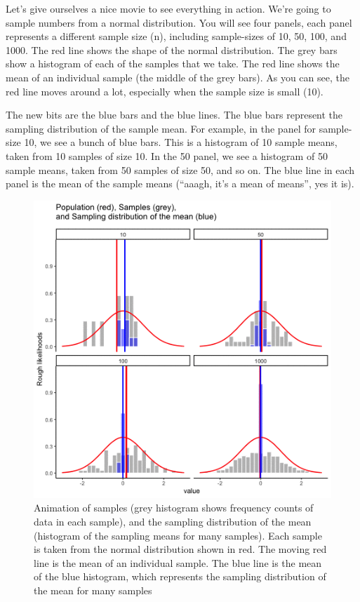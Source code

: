 \documentclass[
]{book}
\begin{document}
Let's give ourselves a nice movie to see everything in action. We're going to sample numbers from a normal distribution. You will see four panels, each panel represents a different sample size (n), including sample-sizes of 10, 50, 100, and 1000. The red line shows the shape of the normal distribution. The grey bars show a histogram of each of the samples that we take. The red line shows the mean of an individual sample (the middle of the grey bars). As you can see, the red line moves around a lot, especially when the sample size is small (10).

The new bits are the blue bars and the blue lines. The blue bars represent the sampling distribution of the sample mean. For example, in the panel for sample-size 10, we see a bunch of blue bars. This is a histogram of 10 sample means, taken from 10 samples of size 10. In the 50 panel, we see a histogram of 50 sample means, taken from 50 samples of size 50, and so on. The blue line in each panel is the mean of the sample means (``aaagh, it's a mean of means'', yes it is).

\begin{figure}
\centering
\includegraphics{gifs/sampleDistNormal-1.gif}
\caption{\label{fig:4samplingmean}Animation of samples (grey histogram shows frequency counts of data in each sample), and the sampling distribution of the mean (histogram of the sampling means for many samples). Each sample is taken from the normal distribution shown in red. The moving red line is the mean of an individual sample. The blue line is the mean of the blue histogram, which represents the sampling distribution of the mean for many samples}
\end{figure}
\end{document}
